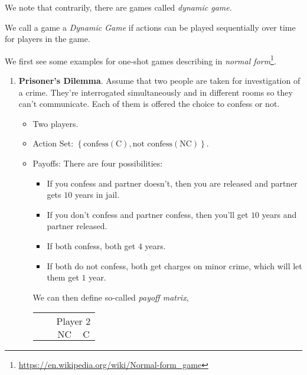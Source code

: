 We note that contrarily, there are games called \emph{dynamic game}.
\begin{definition}
	We call a game a \emph{Dynamic Game} if actions can be played sequentially over time for players in the game.
\end{definition}

\begin{eg}
	We first see some examples for one-shot games describing in \emph{normal form}\footnote{\url{https://en.wikipedia.org/wiki/Normal-form_game}}.
	\begin{enumerate}
		\item \textbf{Prisoner's Dilemma}. Assume that two people are taken for investigation of a crime. They're interrogated simultaneously and in different rooms so
		      they can't communicate. Each of them is offered the choice to confess or not.
		      \begin{itemize}
			      \item Two players.
			      \item Action Set: \(\left\{\text{confess}(\mathrm{C}), \text{not confess}(\mathrm{NC})\right\}\).
			      \item Payoffs: There are four possibilities:
			            \begin{itemize}
				            \item If you confess and partner doesn't, then you are released and partner gets \(10\) years in jail.
				            \item If you don't confess and partner confess, then you'll get \(10\) years and partner released.
				            \item If both confess, both get \(4\) years.
				            \item If both do not confess, both get charges on minor crime, which will let them get \(1\) year.
			            \end{itemize}
			            We can then define so-called \emph{payoff matrix},
			            \begin{table}[H]
				            \centering
				            \setlength{\extrarowheight}{2pt}
				            \begin{tabular}{cc|c|c|}
					                                      & \multicolumn{1}{c}{} & \multicolumn{2}{c}{Player $2$}                                       \\
					                                      & \multicolumn{1}{c}{} & \multicolumn{1}{c}{$\mathrm{NC}$} & \multicolumn{1}{c}{$\mathrm{C}$} \\\cline{3-4}

\end{tabular}
\end{table}
\end{itemize}
\end{enumerate}
\end{eg}
